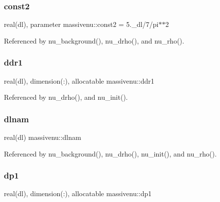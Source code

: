 \mbox{\label{namespacemassivenu_a63b8c9d69523c7f853ffbcc4d48fda0e}} 
\subsubsection{\texorpdfstring{const2}{const2}}
{\footnotesize\ttfamily real(dl), parameter massivenu\+::const2 = 5.\+\_\+dl/7/pi$\ast$$\ast$2\hspace{0.3cm}{\ttfamily [private]}}



Referenced by nu\+\_\+background(), nu\+\_\+drho(), and nu\+\_\+rho().

\mbox{\label{namespacemassivenu_a9d5815d7727b8913cba78eb9fb6d002c}} 
\subsubsection{\texorpdfstring{ddr1}{ddr1}}
{\footnotesize\ttfamily real(dl), dimension(\+:), allocatable massivenu\+::ddr1\hspace{0.3cm}{\ttfamily [private]}}



Referenced by nu\+\_\+drho(), and nu\+\_\+init().

\mbox{\label{namespacemassivenu_a0bc7918cccdf1d31a74fd0b7c68f6249}} 
\subsubsection{\texorpdfstring{dlnam}{dlnam}}
{\footnotesize\ttfamily real(dl) massivenu\+::dlnam\hspace{0.3cm}{\ttfamily [private]}}



Referenced by nu\+\_\+background(), nu\+\_\+drho(), nu\+\_\+init(), and nu\+\_\+rho().

\mbox{\label{namespacemassivenu_a2bf645ad1caf3996fa724d4351b0b5a8}} 
\subsubsection{\texorpdfstring{dp1}{dp1}}
{\footnotesize\ttfamily real(dl), dimension(\+:), allocatable massivenu\+::dp1\hspace{0.3cm}{\ttfamily [private]}}




